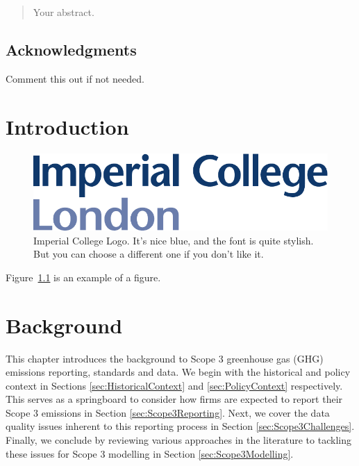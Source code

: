 \documentclass[12pt,twoside]{report}
\date{September 2024}
\begin{document}



\clearpage{\pagestyle{empty}\cleardoublepage}
\setcounter{page}{1}
\pagestyle{fancy}

\begin{abstract}
Your abstract.
\end{abstract}

\cleardoublepage
\section*{Acknowledgments}
Comment this out if not needed.

\clearpage{\pagestyle{empty}\cleardoublepage}

\tableofcontents 


\clearpage{\pagestyle{empty}\cleardoublepage}
\setcounter{page}{1}
\fancyhead[LE,RO]{\slshape \rightmark}
\fancyhead[LO,RE]{\slshape \leftmark}

\chapter{Introduction}

\begin{figure}[tb]
\centering
\includegraphics[width = 0.4\hsize]{./figures/imperial}
\caption{Imperial College Logo. It's nice blue, and the font is quite stylish. But you can choose a different one if you don't like it.}
\label{fig:logo}
\end{figure}

Figure~\ref{fig:logo} is an example of a figure. 

\chapter{Background}

This chapter introduces the background to Scope 3 greenhouse gas (GHG) emissions reporting, standards and data. We begin with the historical and policy context in Sections \ref{sec:HistoricalContext} and \ref{sec:PolicyContext} respectively. This serves as a springboard to consider how firms are expected to report their Scope 3 emissions in Section \ref{sec:Scope3Reporting}. Next, we cover the data quality issues inherent to this reporting process in Section \ref{sec:Scope3Challenges}. Finally, we conclude by reviewing various approaches in the literature to tackling these issues for Scope 3 modelling in Section \ref{sec:Scope3Modelling}. 
\end{document}
